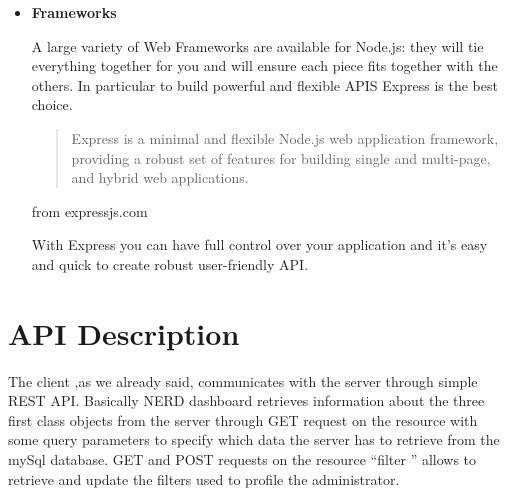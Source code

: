 \documentclass[a4paper,13pt]{report}
\begin{document}
\begin{itemize}
                        \item
            \textbf{Frameworks}

            A large variety of Web Frameworks are available for Node.js: they will tie everything together for you and will ensure each piece fits together with the others.
            In particular to build powerful and flexible APIS Express is the best choice.
            \begin{quote}
            Express is a minimal and flexible Node.js web application framework, providing a robust set of features for building single and multi-page, and hybrid web applications.
            \end{quote}
                    \begin{flushright}
          from expressjs.com  \cite{express}
        \end{flushright}


            With Express you can have full control over your application and it's easy and quick to create robust user-friendly API.

        \end{itemize}
    \section{API Description}
        The client ,as we already said, communicates with the server through simple REST API.
        Basically NERD dashboard retrieves information about the three first class objects from the server through GET request on the resource with some query parameters to specify which data the server has to retrieve from the mySql database.
        GET and POST requests on the resource ``filter '' allows to retrieve and update the filters used to profile the administrator.

\end{document}
